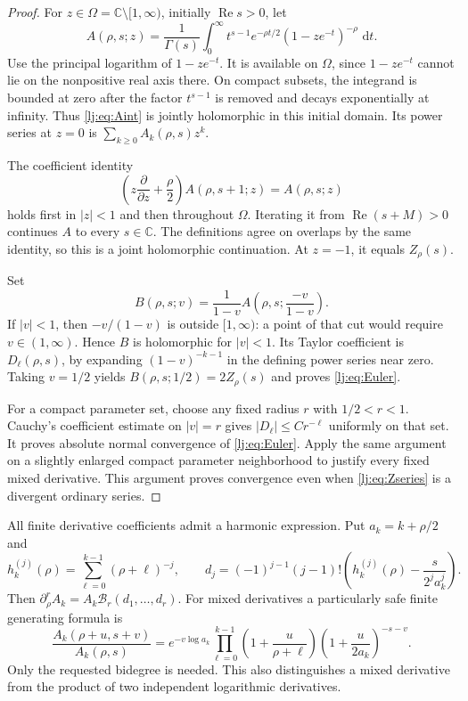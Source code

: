 \documentclass[11pt,a4paper]{article}
\numberwithin{equation}{section}
\theoremstyle{definition}
\theoremstyle{remark}
\DeclareMathOperator{\re}{Re}
\newcommand{\dd}{\,\mathrm d}
\begin{document}
\begin{proof}
For $z\in\Omega=\mathbb C\setminus[1,\infty)$, initially $\re s>0$,
let
\begin{equation}
 A(\rho,s;z)=\frac1{\Gamma(s)}\int_0^\infty
        t^{s-1}e^{-\rho t/2}(1-ze^{-t})^{-\rho}\,\dd t.
 \label{lj:eq:Aint}
\end{equation}
Use the principal logarithm of $1-ze^{-t}$. It is available on
$\Omega$, since $1-ze^{-t}$ cannot lie on the nonpositive real axis
there. On compact subsets, the integrand is bounded at zero after the
factor $t^{s-1}$ is removed and decays exponentially at infinity.
Thus \eqref{lj:eq:Aint} is jointly holomorphic in this initial domain.
Its power series at $z=0$ is $\sum_{k\geq0}A_k(\rho,s)z^k$.

The coefficient identity
\begin{equation}
 \left(z\frac\partial{\partial z}+\frac\rho2\right)
 A(\rho,s+1;z)=A(\rho,s;z)
 \label{lj:eq:Aladder}
\end{equation}
holds first in $|z|<1$ and then throughout $\Omega$. Iterating it from
$\re(s+M)>0$ continues $A$ to every $s\in\mathbb C$. The definitions
agree on overlaps by the same identity, so this is a joint holomorphic
continuation. At $z=-1$, it equals $Z_\rho(s)$.

Set
\[
 B(\rho,s;v)=\frac1{1-v}
              A\left(\rho,s;\frac{-v}{1-v}\right).
\]
If $|v|<1$, then $-v/(1-v)$ is outside $[1,\infty)$: a point of that
cut would require $v\in(1,\infty)$. Hence $B$ is holomorphic for
$|v|<1$. Its Taylor coefficient is $D_\ell(\rho,s)$, by expanding
$(1-v)^{-k-1}$ in the defining power series near zero.
Taking $v=1/2$ yields $B(\rho,s;1/2)=2Z_\rho(s)$ and proves
\eqref{lj:eq:Euler}.

For a compact parameter set, choose any fixed radius $r$ with
$1/2<r<1$. Cauchy's coefficient estimate on $|v|=r$ gives
$|D_\ell|\leq C r^{-\ell}$ uniformly on that set. It proves absolute
normal convergence of \eqref{lj:eq:Euler}. Apply the same argument on
a slightly enlarged compact parameter neighborhood to justify every
fixed mixed derivative. This argument proves convergence even when
\eqref{lj:eq:Zseries} is a divergent ordinary series.
\end{proof}

All finite derivative coefficients admit a harmonic expression. Put
$a_k=k+\rho/2$ and
\[
 h_k^{(j)}(\rho)=\sum_{\ell=0}^{k-1}(\rho+\ell)^{-j},\qquad
 d_j=(-1)^{j-1}(j-1)!
       \left(h_k^{(j)}(\rho)-\frac{s}{2^ja_k^j}\right).
\]
Then $\partial_\rho^r A_k=A_k\mathcal B_r(d_1,\ldots,d_r)$.
For mixed derivatives a particularly safe finite generating formula is
\begin{equation}
 \frac{A_k(\rho+u,s+v)}{A_k(\rho,s)}
 =e^{-v\log a_k}
       \prod_{\ell=0}^{k-1}\left(1+\frac{u}{\rho+\ell}\right)
       \left(1+\frac{u}{2a_k}\right)^{-s-v}.
 \label{lj:eq:mixedcoeff}
\end{equation}
Only the requested bidegree is needed. This also distinguishes a mixed
derivative from the product of two independent logarithmic derivatives.
\end{document}
